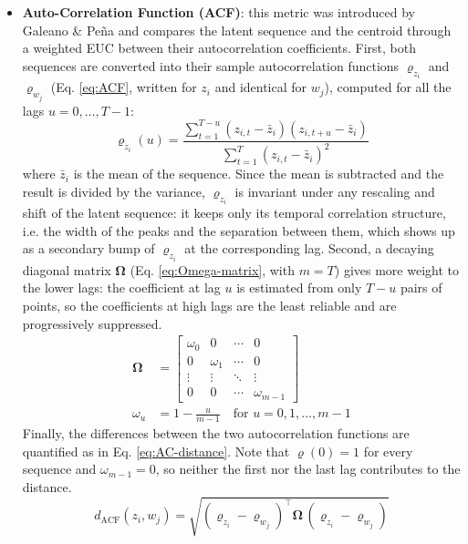 \begin{itemize}
\begin{itemize}
        \item \textbf{Auto-Correlation Function (ACF)}: this metric was introduced by Galeano \& Pe\~{n}a \cite{Galeano} and compares the latent sequence and the centroid through a weighted \ac{EUC} between their autocorrelation coefficients. First, both sequences are converted into their sample autocorrelation functions $\varrho_{z_i}$ and $\varrho_{w_j}$ (Eq. \ref{eq:ACF}, written for $z_i$ and identical for $w_j$), computed for all the lags $u = 0, \dots, T-1$:
        \begin{equation}
            \label{eq:ACF}
            \varrho_{z_i}(u) = \frac{\sum_{t=1}^{T-u} (z_{i,t} - \bar{z}_i)(z_{i,t+u} - \bar{z}_i)}{\sum_{t=1}^{T} (z_{i,t} - \bar{z}_i)^2}
        \end{equation}
        where $\bar{z}_i$ is the mean of the sequence. Since the mean is subtracted and the result is divided by the variance, $\varrho_{z_i}$ is invariant under any rescaling and shift of the latent sequence: it keeps only its temporal correlation structure, i.e. the width of the peaks and the separation between them, which shows up as a secondary bump of $\varrho_{z_i}$ at the corresponding lag. Second, a decaying diagonal matrix $\boldsymbol{\Omega}$ (Eq. \ref{eq:Omega-matrix}, with $m = T$) gives more weight to the lower lags: the coefficient at lag $u$ is estimated from only $T-u$ pairs of points, so the coefficients at high lags are the least reliable and are progressively suppressed.
        \begin{equation}
            \label{eq:Omega-matrix}
            \begin{aligned}
                \boldsymbol{\Omega} &= \begin{bmatrix} 
                \omega_0 & 0 & \cdots & 0 \\ 
                0 & \omega_1 & \cdots & 0 \\ 
                \vdots & \vdots & \ddots & \vdots \\ 
                0 & 0 & \cdots & \omega_{m-1} 
                \end{bmatrix} \\[1ex]
                \omega_u &= 1 - \frac{u}{m-1} \quad \text{for } u = 0, 1, \dots, m-1
            \end{aligned}
        \end{equation}
        Finally, the differences between the two autocorrelation functions are quantified as in Eq. \ref{eq:AC-distance}. Note that $\varrho(0) = 1$ for every sequence and $\omega_{m-1} = 0$, so neither the first nor the last lag contributes to the distance.
        \begin{equation}
            \label{eq:AC-distance}
            d_{\text{ACF}}(z_i, w_j) = \sqrt{(\varrho_{z_i} - \varrho_{w_j})^{\top} \boldsymbol{\Omega} \, (\varrho_{z_i} - \varrho_{w_j})}
        \end{equation}
    \end{itemize}


\end{itemize}
